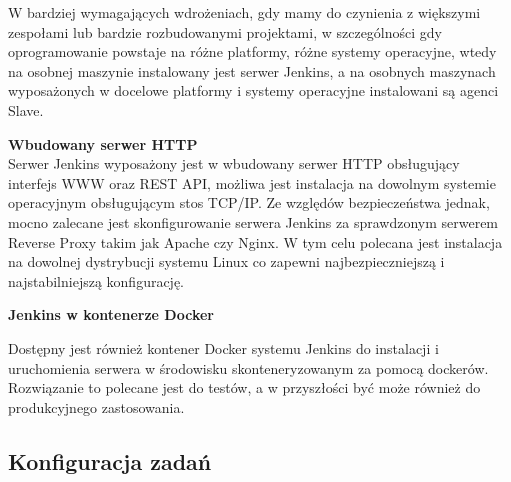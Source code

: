 \documentclass[12pt]{article}
\renewcommand{\_}{\kern-1.5pt\textunderscore\kern-1.5pt}
\begin{document}
\begin{adjustwidth}{1.0in}{0.0in}
W bardziej wymagających wdrożeniach, gdy mamy do czynienia z większymi zespołami lub bardzie rozbudowanymi projektami, w szczególności gdy oprogramowanie powstaje na różne platformy, różne systemy operacyjne, wtedy na osobnej maszynie instalowany jest serwer Jenkins, a na osobnych maszynach wyposażonych w docelowe platformy i systemy operacyjne instalowani są agenci Slave.\par

\end{adjustwidth}


\vspace{\baselineskip}
\begin{adjustwidth}{1.0in}{0.0in}
\textbf{Wbudowany serwer HTTP\\
}Serwer Jenkins wyposażony jest w wbudowany serwer HTTP obsługujący interfejs WWW oraz REST API, możliwa jest instalacja na dowolnym systemie operacyjnym obsługującym stos TCP/IP. Ze względów bezpieczeństwa jednak, mocno zalecane jest skonfigurowanie serwera Jenkins za sprawdzonym serwerem Reverse Proxy takim jak Apache czy Nginx. W tym celu polecana jest instalacja na dowolnej dystrybucji systemu Linux co zapewni najbezpieczniejszą i najstabilniejszą konfigurację.\par

\end{adjustwidth}


\vspace{\baselineskip}
\begin{adjustwidth}{0.5in}{0.0in}
\textbf{Jenkins w kontenerze Docker}\par

\end{adjustwidth}

\begin{adjustwidth}{1.0in}{0.0in}
Dostępny jest również kontener Docker systemu Jenkins do instalacji i uruchomienia serwera w środowisku skonteneryzowanym za pomocą dockerów. Rozwiązanie to polecane jest do testów, a w przyszłości być może również do produkcyjnego zastosowania.\par

\end{adjustwidth}


\vspace{\baselineskip}

\vspace{\baselineskip}

\vspace{\baselineskip}
\begin{adjustwidth}{0.5in}{0.0in}
\subsection*{Konfiguracja zadań}
\end{adjustwidth}
\end{document}
